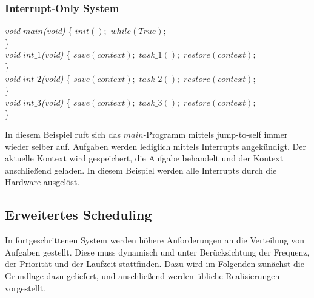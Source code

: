 \subsubsection{Interrupt-Only System}
\begin{algorithm}
\label{sced4}
\begin{algorithmic}[1]

\BState \textit{void $main$(void)}
\{
\State $init();$
\State $while(True);$\\
\}\\

\BState \textit{void $int\_1$(void)}
\{
\State $save(context);$
\State $task\_1();$
\State $restore(context)$;\\
\}\\

\BState \textit{void $int\_2$(void)}
\{
\State $save(context);$
\State $task\_2();$
\State $restore(context)$;\\
\}\\

\BState \textit{void $int\_3$(void)}
\{
\State $save(context);$
\State $task\_3();$
\State $restore(context)$;\\
\}

\end{algorithmic}
\end{algorithm}
In diesem Beispiel ruft sich das $main$-Programm mittels jump-to-self immer wieder selber auf. Aufgaben werden lediglich mittels Interrupts angekündigt. Der aktuelle Kontext wird gespeichert, die Aufgabe behandelt und der Kontext anschließend geladen. In diesem Beispiel werden alle Interrupts durch die Hardware ausgelöst.\\

\subsection{Erweitertes Scheduling}\label{2.7}
In fortgeschrittenen System werden höhere Anforderungen an die Verteilung von Aufgaben gestellt. Diese muss dynamisch und unter Berücksichtung der Frequenz, der Priorität und der Laufzeit stattfinden. Dazu wird im Folgenden zunächst die Grundlage dazu geliefert, und anschließend werden übliche Realisierungen vorgestellt.

